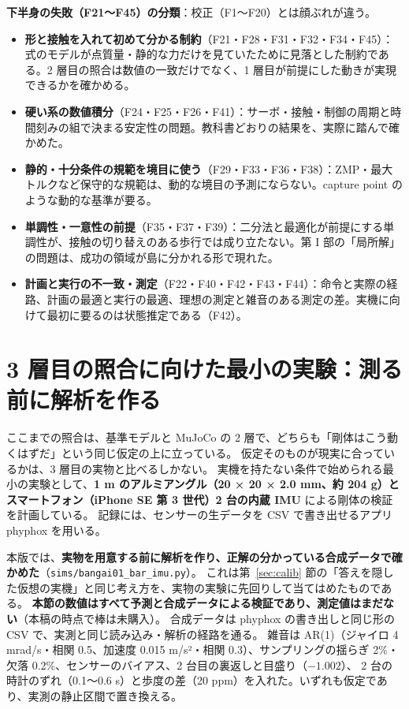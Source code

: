 \documentclass[paper=a4paper,fontsize=10pt,twocolumn,column_gap=2zw,line_length=24zw,number_of_lines=46,head_space=20mm]{jlreq}
\begin{document}
\textbf{下半身の失敗（F21〜F45）の分類}：校正（F1〜F20）とは顔ぶれが違う。
\begin{itemize}\setlength{\itemsep}{0pt}
\item \textbf{形と接触を入れて初めて分かる制約}（F21・F28・F31・F32・F34・F45）：式のモデルが点質量・静的な力だけを見ていたために見落とした制約である。2 層目の照合は数値の一致だけでなく、1 層目が前提にした動きが実現できるかを確かめる。
\item \textbf{硬い系の数値積分}（F24・F25・F26・F41）：サーボ・接触・制御の周期と時間刻みの組で決まる安定性の問題。教科書どおりの結果を、実際に踏んで確かめた。
\item \textbf{静的・十分条件の規範を境目に使う}（F29・F33・F36・F38）：ZMP・最大トルクなど保守的な規範は、動的な境目の予測にならない。capture point のような動的な基準が要る。
\item \textbf{単調性・一意性の前提}（F35・F37・F39）：二分法と最適化が前提にする単調性が、接触の切り替えのある歩行では成り立たない。第 I 部の「局所解」の問題は、成功の領域が島に分かれる形で現れた。
\item \textbf{計画と実行の不一致・測定}（F22・F40・F42・F43・F44）：命令と実際の経路、計画の最適と実行の最適、理想の測定と雑音のある測定の差。実機に向けて最初に要るのは状態推定である（F42）。
\end{itemize}


\section{3 層目の照合に向けた最小の実験：測る前に解析を作る}\label{sec:bangai}

ここまでの照合は、基準モデルと MuJoCo の 2 層で、どちらも「剛体はこう動くはずだ」という同じ仮定の上に立っている。
仮定そのものが現実に合っているかは、3 層目の実物と比べるしかない。
実機を持たない条件で始められる最小の実験として、\textbf{1 m のアルミアングル（20 × 20 × 2.0 mm、約 204 g）とスマートフォン（iPhone SE 第 3 世代）2 台の内蔵 IMU} による剛体の検証を計画している。
記録には、センサーの生データを CSV で書き出せるアプリ phyphox \cite{phyphox} を用いる。

本版では、\textbf{実物を用意する前に解析を作り、正解の分かっている合成データで確かめた}（\texttt{sims/bangai01\_bar\_imu.py}）。
これは第~\ref{sec:calib} 節の「答えを隠した仮想の実機」と同じ考え方を、実物の実験に先回りして当てはめたものである。
\textbf{本節の数値はすべて予測と合成データによる検証であり、測定値はまだない}（本稿の時点で棒は未購入）。
合成データは phyphox の書き出しと同じ形の CSV で、実測と同じ読み込み・解析の経路を通る。
雑音は AR(1)（ジャイロ 4 mrad/s・相関 0.5、加速度 0.015 m/s²・相関 0.3）、サンプリングの揺らぎ 2\%・欠落 0.2\%、センサーのバイアス、2 台目の裏返しと目盛り（$-1.002$）、
2 台の時計のずれ（0.1〜0.6 s）と歩度の差（20 ppm）を入れた。いずれも仮定であり、実測の静止区間で置き換える。
\end{document}
